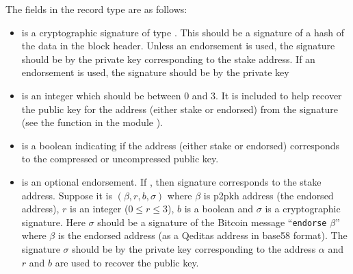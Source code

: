 The fields in the record type {} are as follows:
\begin{itemize}
\item {} is a cryptographic signature of type {}.
This should be a signature of a hash of the data in the block header.
Unless an endorsement is used, the signature should be by the private key
corresponding to the stake address.
If an endorsement is used, the signature should be by the private key
\item {} is an integer which should be between $0$ and $3$.
It is included to help recover the public key for the address (either stake or endorsed) from the signature
(see the function {} in the module {}).
\item {} is a boolean indicating if the address (either stake or endorsed) corresponds
to the compressed or uncompressed public key.
\item {} is an optional endorsement.
If {}, then signature corresponds to the stake address.
Suppose it is $(\beta,r,b,\sigma)$ where $\beta$ is p2pkh address (the endorsed address), $r$ is an integer ($0\leq r\leq 3$),
$b$ is a boolean and $\sigma$ is a cryptographic signature.
Here $\sigma$ should be a signature of the Bitcoin message
``\verb+endorse+ $\beta$''
where $\beta$ is the endorsed address (as a Qeditas address in base58 format).
The signature $\sigma$ should be by the private key corresponding to the address $\alpha$
and $r$ and $b$ are used to recover the public key.
\end{itemize}

